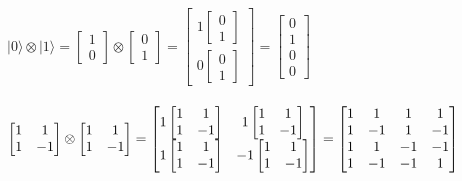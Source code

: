 \documentclass[11pt, fleqn]{article}
\begin{document}
$|0\rangle \otimes |1\rangle=
\begin{bmatrix}1\\0 \end{bmatrix}\otimes
\begin{bmatrix}0\\1 \end{bmatrix}=
\begin{bmatrix}1\begin{bmatrix}0\\1 \end{bmatrix}\\0\begin{bmatrix}0\\1 \end{bmatrix}\end{bmatrix}=
\begin{bmatrix}0\\1\\0\\0 \end{bmatrix}$
\\~\\

$\begin{bmatrix}1&1\\1&-1\end{bmatrix}\otimes
\begin{bmatrix}1&1\\1&-1\end{bmatrix} =
\begin{bmatrix}1\begin{bmatrix}1&1\\1&-1\end{bmatrix}&1\begin{bmatrix}1&1\\1&-1\end{bmatrix}\\1\begin{bmatrix}1&1\\1&-1\end{bmatrix}&-1\begin{bmatrix}1&1\\1&-1\end{bmatrix}\end{bmatrix}=
\begin{bmatrix}1&1&1&1\\1&-1&1&-1\\1&1&-1&-1\\1&-1&-1&1\\\end{bmatrix}
\\~\\$
\end{document}
